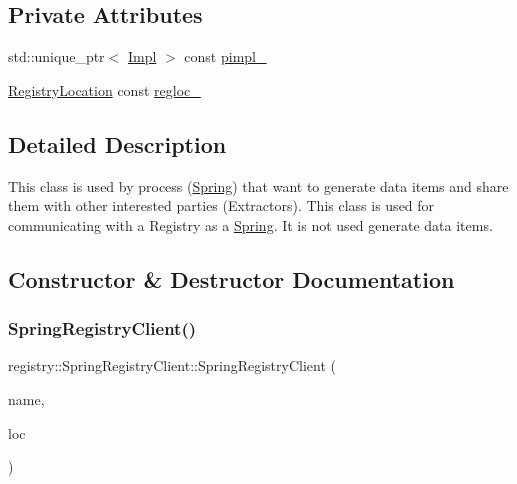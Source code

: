 \subsection*{Private Attributes}
\begin{DoxyCompactItemize}
\item 
std\+::unique\+\_\+ptr$<$ \hyperlink{classregistry_1_1SpringRegistryClient_1_1Impl}{Impl} $>$ const \hyperlink{classregistry_1_1SpringRegistryClient_a509b09f05c4caf239282663b41420a76}{pimpl\+\_\+}
\item 
\hyperlink{structregistry_1_1RegistryLocation}{Registry\+Location} const \hyperlink{classregistry_1_1SpringRegistryClient_a08350bc00947b986855eb6c462d03d2f}{regloc\+\_\+}
\end{DoxyCompactItemize}


\subsection{Detailed Description}
This class is used by process (\hyperlink{classSpring}{Spring}) that want to generate data items and share them with other interested parties (Extractors). This class is used for communicating with a Registry as a \hyperlink{classSpring}{Spring}. It is not used generate data items. 

\subsection{Constructor \& Destructor Documentation}
\mbox{\label{classregistry_1_1SpringRegistryClient_a891cfee599ee0ab6bd9239539a12f885}} 
\subsubsection{\texorpdfstring{Spring\+Registry\+Client()}{SpringRegistryClient()}\hspace{0.1cm}{\footnotesize\ttfamily [1/3]}}
{\footnotesize\ttfamily registry\+::\+Spring\+Registry\+Client\+::\+Spring\+Registry\+Client (\begin{DoxyParamCaption}\item[{std\+::string const \&}]{name,  }\item[{\hyperlink{structregistry_1_1RegistryLocation}{Registry\+Location} const \&}]{loc }\end{DoxyParamCaption})\hspace{0.3cm}{\ttfamily [noexcept]}}

